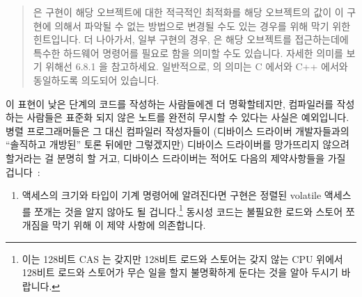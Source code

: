 {{{{\begin{quote}
	 은 구현이 해당 오브젝트에 대한 적극적인 최적화를 해당
	오브젝트의 값이 이 구현에 의해서 파악될 수 없는 방법으로 변경될 수도
	있는 경우를 위해 막기 위한 힌트입니다.
	더 나아가서, 일부 구현의 경우,  은 해당 오브젝트를
	접근하는데에 특수한 하드웨어 명령어를 필요로 함을 의미할 수도 있습니다.
	자세한 의미를 보기 위해선 6.8.1 을 참고하세요.
	일반적으로,  의 의미는 C 에서와 C++ 에서와 동일하도록
	의도되어 있습니다.

\end{quote}

이 표현이 낮은 단계의 코드를 작성하는 사람들에겐 더 명확할테지만, 컴파일러를
작성하는 사람들은 표준화 되지 않은 노트를 완전히 무시할 수 있다는 사실은
예외입니다.
병렬 프로그래머들은 그 대신 컴파일러 작성자들이 (디바이스 드라이버 개발자들과의
``솔직하고 개방된'' 토론 뒤에만 그렇겠지만) 디바이스 드라이버를 망가뜨리지
않으려 할거라는 걸 분명히 할 거고, 디바이스 드라이버는 적어도 다음의
제약사항들을 가질 겁니다~\cite{PaulEMcKenney2016P0124R6-LKMM}:

\begin{enumerate}
\item	액세스의 크기와 타입이 기계 명령어에 알려진다면 구현은 정렬된 volatile
	액세스를 쪼개는 것을 알지 않아도 될 겁니다.\footnote{
		이는 128비트 CAS 는 갖지만 128비트 로드와 스토어는 갖지 않는
		CPU 위에서 128비트 로드와 스토어가 무슨 일을 할지 불명확하게
		둔다는 것을 알아 두시기 바랍니다.}
	동시성 코드는 불필요한 로드와 스토어 쪼개짐을 막기 위해 이 제약 사항에
	의존합니다.
\iffalse


\end{enumerate}}}}}

